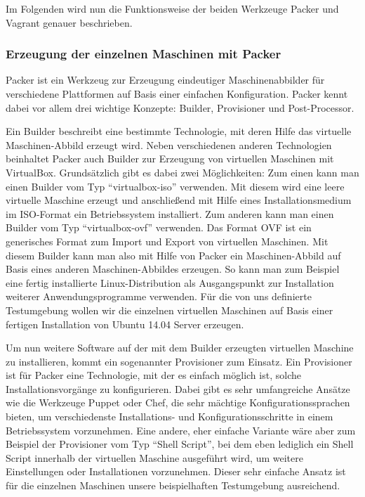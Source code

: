 Im Folgenden wird nun die Funktionsweise der beiden Werkzeuge Packer und Vagrant genauer beschrieben.

\subsubsection{Erzeugung der einzelnen Maschinen mit Packer}

Packer ist ein Werkzeug zur Erzeugung eindeutiger Maschinenabbilder für verschiedene Plattformen auf Basis einer einfachen Konfiguration. Packer kennt dabei vor allem drei wichtige Konzepte: Builder, Provisioner und Post-Processor.

Ein Builder beschreibt eine bestimmte Technologie, mit deren Hilfe das virtuelle Maschinen-Abbild erzeugt wird. Neben verschiedenen anderen Technologien beinhaltet Packer auch Builder zur Erzeugung von virtuellen Maschinen mit VirtualBox. Grundsätzlich gibt es dabei zwei Möglichkeiten: Zum einen kann man einen Builder vom Typ "`virtualbox-iso"' verwenden. Mit diesem wird eine leere virtuelle Maschine erzeugt und anschließend mit Hilfe eines Installationsmedium im ISO-Format ein Betriebssystem installiert. Zum anderen kann man einen Builder vom Typ "`virtualbox-ovf"' verwenden. Das Format OVF ist ein generisches Format zum Import und Export von virtuellen Maschinen. Mit diesem Builder kann man also mit Hilfe von Packer ein Maschinen-Abbild auf Basis eines anderen Maschinen-Abbildes erzeugen. So kann man zum Beispiel eine fertig installierte Linux-Distribution als Ausgangspunkt zur Installation weiterer Anwendungsprogramme verwenden. Für die von uns definierte Testumgebung wollen wir die einzelnen virtuellen Maschinen auf Basis einer fertigen Installation von Ubuntu 14.04 Server erzeugen.

Um nun weitere Software auf der mit dem Builder erzeugten virtuellen Maschine zu installieren, kommt ein sogenannter Provisioner zum Einsatz. Ein Provisioner ist für Packer eine Technologie, mit der es einfach möglich ist, solche Installationsvorgänge zu konfigurieren. Dabei gibt es sehr umfangreiche Ansätze wie die Werkzeuge Puppet oder Chef, die sehr mächtige Konfigurationssprachen bieten, um verschiedenste Installations- und Konfigurationsschritte in einem Betriebssystem vorzunehmen. Eine andere, eher einfache Variante wäre aber zum Beispiel der Provisioner vom Typ "`Shell Script"', bei dem eben lediglich ein Shell Script innerhalb der virtuellen Maschine ausgeführt wird, um weitere Einstellungen oder Installationen vorzunehmen. Dieser sehr einfache Ansatz ist für die einzelnen Maschinen unsere beispielhaften Testumgebung ausreichend.

